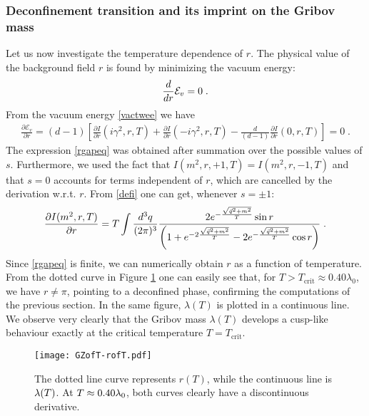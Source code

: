 \subsubsection{Deconfinement transition and its imprint on the Gribov mass}

Let us now investigate the temperature dependence of $r$. The physical value of the background field $r$ is found by minimizing the vacuum energy:
\begin{eqnarray}
\frac{d}{dr} {\cal E}_{v} =0\;.
\end{eqnarray}
From the vacuum energy  \eqref{vactwee} we have
\begin{eqnarray}
\frac{\partial\mathcal{E}_{v}}{\partial r} = (d-1) \left[ \frac{\partial
I}{\partial r}(i\gamma^2,r,T) + \frac{\partial I}{\partial r}(-i\gamma^2,r,T)
- \frac{d}{(d-1)} \frac{\partial I}{\partial r}(0,r,T) \right] = 0\;.
\label{rgapeq}
\end{eqnarray}
The expression \eqref{rgapeq} was obtained after  summation over the
possible values of $s$. Furthermore, we used the fact that $%
I(m^{2},r,+1,T)=I(m^{2},r,-1,T)$ and that $s=0$ accounts for terms
independent of $r$, which are cancelled by the derivation w.r.t. $r$. From %
\eqref{defi} one can get, whenever $s=\pm1$:
\begin{eqnarray}
\frac{\partial I(m^{2},r,T)}{\partial r} = T \int\frac{d^{3}q}{(2\pi)^{3}}
\frac{2e^{-\frac{\sqrt{\vec{q}^2+m^2}}{T}}\sin r}{\left(1+e^{-2\frac{\sqrt{%
\vec{q}^2+m^2}}{T}}-2e^{-\frac{\sqrt{\vec{q}^2+m^2}}{T}}\cos r \right)}\;.
\end{eqnarray}
Since \eqref{rgapeq} is finite, we can numerically obtain $r$ as a function of
temperature. From the dotted curve in Figure \ref{randlambda} one can easily see that, for $T > T_{\text{crit}} \approx 0.40 \lambda_{0}$, we have $%
r \neq \pi$, pointing to a deconfined phase,  confirming
the computations of the previous section. In the same figure, $\lambda(T)$ is plotted in a continuous line. We observe very clearly
that the Gribov mass $\lambda(T)$ develops a cusp-like behaviour exactly at
the critical temperature $T =T_{\text{crit}}$.

\begin{figure}[h]
\begin{center}
\texttt{[image: GZofT-rofT.pdf]}
\end{center}
\caption{The dotted line curve represents $r(T)$, while the continuous line is $\protect\lambda(T)$. At $T\approx 0.40\protect\lambda_{0}$, both curves clearly have a discontinuous derivative.}
\label{randlambda}
\end{figure}

